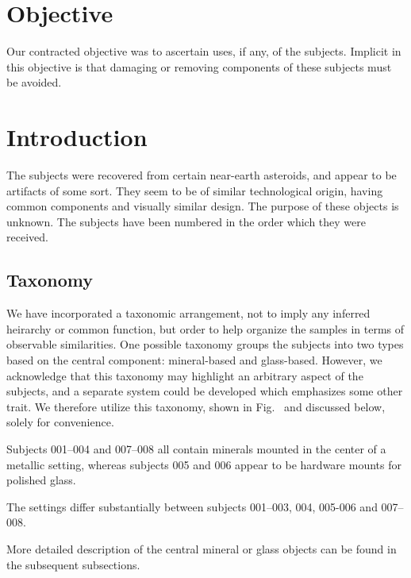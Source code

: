 \documentclass[10pt]{article}
\begin{document}
\maketitle


\section{Objective}
Our contracted objective was to ascertain uses, if any, of the subjects.
Implicit in this objective is that damaging or removing components of these subjects must be avoided.

\section{Introduction}

The subjects were recovered from certain near-earth asteroids, and appear to be artifacts of some sort.  They seem to be of similar technological origin, having common components and visually similar design.  The purpose of these objects is unknown.  The subjects have been numbered in the order which they were received.  

\subsection{Taxonomy}
We have incorporated a taxonomic arrangement, not to imply any inferred heirarchy or common function, but order to help organize the samples in terms of observable similarities.  One possible taxonomy groups the subjects into two types based on the central component: mineral-based and glass-based.
However, we acknowledge that this taxonomy may highlight an arbitrary aspect of the subjects, and a separate system could be developed which emphasizes some other trait.
We therefore utilize this taxonomy, shown in Fig.~ and discussed below, solely for convenience.

Subjects 001--004 and 007--008 all contain minerals mounted in the center of a metallic setting, whereas subjects 005 and 006 appear to be hardware mounts for polished glass.  

The settings differ substantially between subjects 001--003, 004, 005-006 and 007--008.

More detailed description of the central mineral or glass objects can be found in the subsequent subsections.
\end{document}
